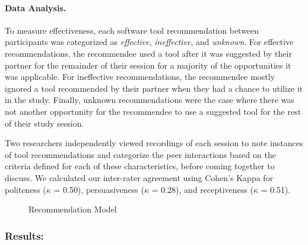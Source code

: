 \paragraph{Data Analysis.} To measure effectiveness, each software tool recommendation between participants was categorized as \textit{effective}, \textit{ineffective}, and \textit{unknown}. For effective recommendations, the recommendee used a tool after it was suggested by their partner for the remainder of their session for a majority of the opportunities it was applicable. For ineffective recommendations, the recommendee mostly ignored a tool recommended by their partner when they had a chance to utilize it in the study. Finally, unknown recommendations were the case where there was not another opportunity for the recommendee to use a suggested tool for the rest of their study session.

Two researchers independently viewed recordings of each session to note instances of tool recommendations and categorize the peer interactions based on the criteria defined for each of these characteristics, before coming together to discuss. We calculated our inter-rater agreement using Cohen's Kappa for politeness ($\kappa$ = 0.50), persuasiveness ($\kappa$ = 0.28), and 
receptiveness ($\kappa$ = 0.51).


\noindent
\begin{figure}
\centering
{}
\caption{Recommendation Model}
\label{fig:rec-model}
\end{figure}

\subsubsection{Results:}

